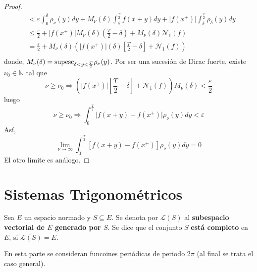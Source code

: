 \documentclass[12pt]{report}
\theoremstyle{largebreak}
\newcommand\abs[1]{\ensuremath{\big|#1\big|}}
\newcommand{\N}[2]{\ensuremath{\mathcal{N}_{#1}\left(#2\right)}}
\newcommand{\Cls}[1]{\ensuremath{\overline{#1}}}
\begin{document}
\begin{proof}
\begin{equation*}
\begin{split}
                &<\varepsilon\int_0^{\delta}\rho_\nu(y)dy+M_\nu(\delta)\int_{\delta}^{\frac{T}{2}}f(x+y)dy+\abs{f(x^+)}\int_{\delta}^{\frac{T}{2}}\rho_\delta(y)dy\\
                &\leq \frac{\varepsilon}{2}+\abs{f(x^+)}M_\nu(\delta)\left(\frac{T}{2}-\delta \right)+M_\nu(\delta)\N{1}{f}\\
                &= \frac{\varepsilon}{2}+M_\nu(\delta)\left(\abs{f(x^+)}(\delta)\left[\frac{T}{2}-\delta\right]+\N{1}{f} \right) \\
            \end{split}
        \end{equation*}
        donde, $M_\nu(\delta)=\textup{supesc}_{\delta<y<\frac{T}{2}}\rho_\nu(y)$. Por ser una sucesión de Dirac fuerte, existe $\nu_0\in\mathbb{N}$ tal que
        \begin{equation*}
            \nu\geq\nu_0\Rightarrow \left(\abs{f(x^+)}\left[\frac{T}{2}-\delta\right]+\N{1}{f}\right)M_\nu(\delta)<\frac{\varepsilon}{2}
        \end{equation*}
        luego
        \begin{equation*}
            \nu\geq\nu_0\Rightarrow \int_0^{\frac{T}{2}}\abs{f(x+y)-f(x^+)} \rho_\nu(y)dy<\varepsilon
        \end{equation*}
        Así,
        \begin{equation*}
            \lim_{\nu\rightarrow\infty}\int_0^{\frac{T}{2}}\left[f(x+y)-f(x^+)\right]\rho_\nu(y)dy=0
        \end{equation*}
        El otro límite es análogo.
    \end{proof}

    \section{Sistemas Trigonométricos}

    \begin{mydef}
        Sea $E$ un espacio normado y $S\subseteq E$. Se denota por $\mathcal{L}(S)$ al \textbf{subespacio vectorial de $E$ generado por $S$}. Se dice que el conjunto $S$ \textbf{está completo} en $E$, si $\Cls{\mathcal{L}(S)}=E$.
    \end{mydef}

    En esta parte se consideran funcoines periódicas de periodo $2\pi$ (al final se trata el caso general).
\end{document}

